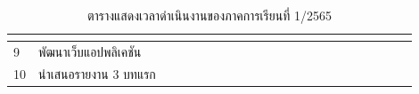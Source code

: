 \documentclass[12pt,oneside,openright,a4paper]{cpe-thai-project}
\begin{document}
\begin{table}[!h]
{\begin{tabular}{|llllllllllllllllllllll|}
      \multicolumn{1}{l|}{\cellcolor[HTML]{FFCE93}} &
      \multicolumn{1}{l|}{\cellcolor[HTML]{FFCE93}} &
      \multicolumn{1}{l|}{\cellcolor[HTML]{FFCE93}} &
      \multicolumn{1}{l|}{\cellcolor[HTML]{FFCE93}} &
      \multicolumn{1}{l|}{\cellcolor[HTML]{FFCE93}} &
      \multicolumn{1}{l|}{\cellcolor[HTML]{FFCE93}} &
      \multicolumn{1}{l|}{\cellcolor[HTML]{FFCE93}} &
      \multicolumn{1}{l|}{\cellcolor[HTML]{FFCE93}} &
      \cellcolor[HTML]{FFCE93} \\ \hline
    \multicolumn{1}{|l|}{9} &
      \multicolumn{1}{l|}{พัฒนาเว็บแอปพลิเคชัน} &
      \multicolumn{1}{l|}{} &
      \multicolumn{1}{l|}{} &
      \multicolumn{1}{l|}{} &
      \multicolumn{1}{l|}{} &
      \multicolumn{1}{l|}{} &
      \multicolumn{1}{l|}{\cellcolor[HTML]{FFCE93}} &
      \multicolumn{1}{l|}{\cellcolor[HTML]{FFCE93}} &
      \multicolumn{1}{l|}{\cellcolor[HTML]{FFCE93}} &
      \multicolumn{1}{l|}{\cellcolor[HTML]{FFCE93}} &
      \multicolumn{1}{l|}{\cellcolor[HTML]{FFCE93}} &
      \multicolumn{1}{l|}{\cellcolor[HTML]{FFCE93}} &
      \multicolumn{1}{l|}{\cellcolor[HTML]{FFCE93}} &
      \multicolumn{1}{l|}{\cellcolor[HTML]{FFCE93}} &
      \multicolumn{1}{l|}{\cellcolor[HTML]{FFCE93}} &
      \multicolumn{1}{l|}{\cellcolor[HTML]{FFCE93}} &
      \multicolumn{1}{l|}{\cellcolor[HTML]{FFCE93}} &
      \multicolumn{1}{l|}{\cellcolor[HTML]{FFCE93}} &
      \multicolumn{1}{l|}{\cellcolor[HTML]{FFCE93}} &
      \multicolumn{1}{l|}{\cellcolor[HTML]{FFCE93}} &
      \cellcolor[HTML]{FFCE93} \\ \hline
    \multicolumn{1}{|l|}{10} &
      \multicolumn{1}{l|}{นำเสนอรายงาน   3 บทแรก} &
      \multicolumn{1}{l|}{} &
      \multicolumn{1}{l|}{} &
      \multicolumn{1}{l|}{} &
      \multicolumn{1}{l|}{} &
      \multicolumn{1}{l|}{} &
      \multicolumn{1}{l|}{} &
      \multicolumn{1}{l|}{} &
      \multicolumn{1}{l|}{} &
      \multicolumn{1}{l|}{} &
      \multicolumn{1}{l|}{} &
      \multicolumn{1}{l|}{} &
      \multicolumn{1}{l|}{} &
      \multicolumn{1}{l|}{} &
      \multicolumn{1}{l|}{} &
      \multicolumn{1}{l|}{} &
      \multicolumn{1}{l|}{} &
      \multicolumn{1}{l|}{\cellcolor[HTML]{FFCE93}} &
      \multicolumn{1}{l|}{} &
      \multicolumn{1}{l|}{} &
       \\ \hline
    \end{tabular}%
    }
    \caption{\centering  ตารางแสดงเวลาดำเนินงานของภาคการเรียนที่ 1/2565} \label{tbl:working1}
\end{table}

\end{document}
